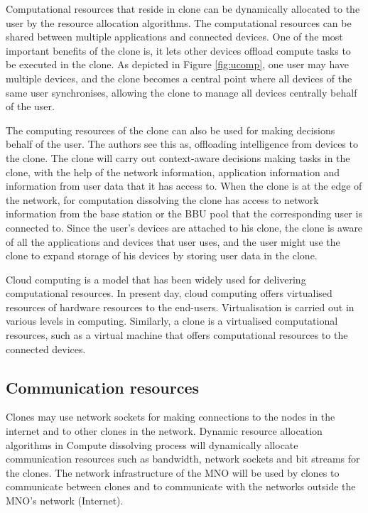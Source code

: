 \documentclass[12pt,journal,compsoc, onecolumn]{IEEEtran}
\begin{document}
Computational resources that reside in clone can be dynamically allocated to the user by the resource allocation algorithms. The computational resources can be shared between multiple applications and connected devices. One of the most important benefits of the clone is, it lets other devices offload compute tasks to be executed in the clone. As depicted in Figure \ref{fig:ucomp}, one user may have multiple devices, and the clone becomes a central point where all devices of the same user synchronises, allowing the clone to manage all devices centrally behalf of the user.

The computing resources of the clone can also be used for making decisions behalf of the user. The authors see this as, offloading intelligence from devices to the clone. The clone will carry out context-aware decisions making tasks in the clone, with the help of the network information, application information and information from user data that it has access to. When the clone is at the edge of the network, for computation dissolving the clone has access to network information from the base station or the BBU pool that the corresponding user is connected to. Since the user's devices are attached to his clone, the clone is aware of all the applications and devices that user uses, and the user might use the clone to expand storage of his devices by storing user data in the clone.

Cloud computing is a model that has been widely used for delivering computational resources. In present day, cloud computing offers virtualised resources of hardware resources to the end-users. Virtualisation is carried out in various levels in computing. Similarly, a clone is a virtualised computational resources, such as a virtual machine that offers computational resources to the connected devices.


\subsection{Communication resources}

Clones may use network sockets for making connections to the nodes in the internet and to other clones in the network. Dynamic resource allocation algorithms in Compute dissolving process will dynamically allocate communication resources such as bandwidth, network sockets and bit streams for the clones. The network infrastructure of the MNO will be used by clones to communicate between clones and to communicate  with the networks outside the MNO's network (Internet). 
\end{document}
